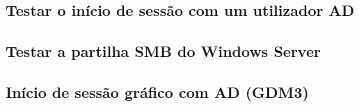 \subsection[Testar o início de sessão com um utilizador AD]{Testar o início de sessão com um utilizador AD \aguardar}

\subsection[Testar a partilha SMB do Windows Server]{Testar a partilha SMB do Windows Server \aguardar}

\subsection[Início de sessão gráfico com AD (GDM3)]{Início de sessão gráfico com AD (GDM3) \aguardar}
